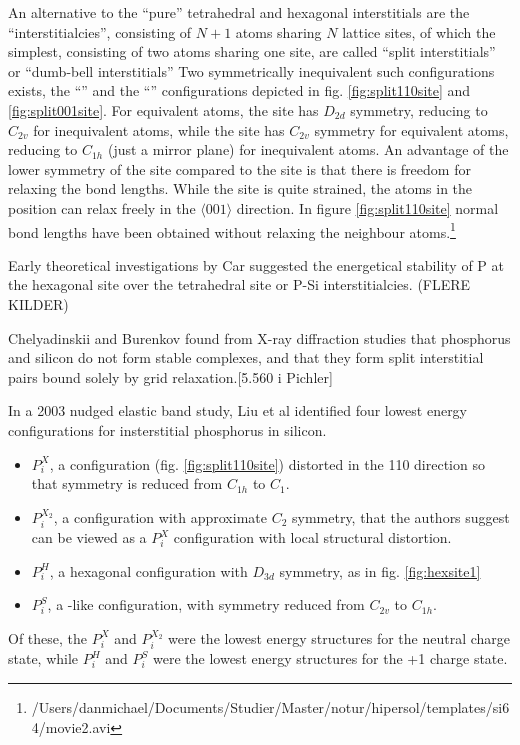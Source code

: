 \documentclass[11pt,bibliography=totoc,index=totoc]{scrbook}   %
\begin{document}
An alternative to the ``pure'' tetrahedral and hexagonal interstitials are the ``interstitialcies'', consisting of $N+1$ atoms sharing $N$ lattice sites, of which the simplest, consisting of two atoms sharing one site, are called ``split interstitials'' or ``dumb-bell interstitials''\cite[6]{Pichler:2004}
Two symmetrically inequivalent such configurations exists, the ``'' and the ``'' configurations depicted in fig. \ref{fig:split110site} and \ref{fig:split001site}.
For equivalent atoms, the  site has $D_{2d}$ symmetry, reducing to $C_{2v}$ for inequivalent atoms,
while the  site has $C_{2v}$ symmetry for equivalent atoms, reducing to $C_{1h}$ (just a mirror plane) for inequivalent atoms.
An advantage of the lower symmetry of the  site compared to the  site is that there is freedom for relaxing the bond lengths. 
While the  site is quite strained, the atoms in the  position can relax freely in the $\langle 001 \rangle$ direction. 
In figure \ref{fig:split110site} normal bond lengths have been obtained without relaxing the neighbour atoms.\footnote{
/Users/danmichael/Documents/Studier/Master/notur/hipersol/templates/si64/movie2.avi }



Early theoretical investigations by Car\cite{Car:1985} suggested the energetical stability of P at the hexagonal site over the tetrahedral site or P-Si interstitialcies. (FLERE KILDER)

Chelyadinskii and Burenkov found from X-ray diffraction studies that phosphorus and silicon do not form stable complexes, and that they form split interstitial pairs bound solely by grid relaxation.[5.560 i Pichler]

In a 2003 nudged elastic band study, Liu et al identified four lowest energy configurations for insterstitial phosphorus in silicon.
\begin{itemize}
  \item $P_i^X$, a  configuration (fig. \ref{fig:split110site}) distorted in the 110 direction so that symmetry is reduced from $C_{1h}$ to $C_1$.
  \item $P_i^{X_2}$, a configuration with approximate $C_2$ symmetry, that the authors suggest can be viewed as a $P_i^X$ configuration with local structural distortion.
  \item $P_i^H$, a hexagonal configuration with $D_{3d}$ symmetry, as in fig. \ref{fig:hexsite1}
  \item $P_i^S$, a -like configuration, with symmetry reduced from $C_{2v}$ to $C_{1h}$.
\end{itemize}
Of these, the $P_i^X$ and $P_i^{X_2}$ were the lowest energy structures for the neutral charge state, while $P_i^H$ and $P_i^S$ were the lowest energy structures for the +1 charge state.\cite{Liu:2003}
\end{document}
